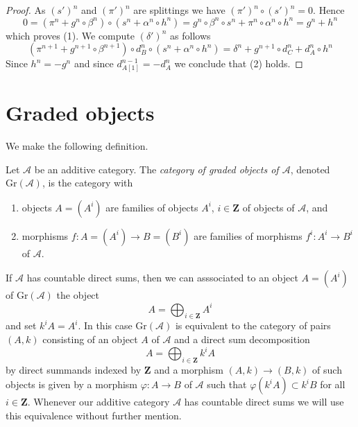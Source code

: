 \begin{proof}
As $(s')^n$ and $(\pi')^n$ are splittings we have $(\pi')^n \circ (s')^n = 0$.
Hence
$$
0 = ( \pi^n + g^n \circ \beta^n ) \circ ( s^n + \alpha^n \circ h^n ) =
g^n \circ \beta^n \circ s^n + \pi^n \circ \alpha^n \circ h^n =
g^n + h^n
$$
which proves (1). We compute $(\delta')^n$ as follows
$$
( \pi^{n + 1} + g^{n + 1} \circ \beta^{n + 1} )
\circ d_B^n \circ
( s^n + \alpha^n \circ h^n )
= \delta^n + g^{n + 1} \circ d_C^n + d_A^n \circ h^n
$$
Since $h^n = -g^n$ and since $d_{A[1]}^{n - 1} = -d_A^n$ we conclude that (2)
holds.
\end{proof}




\section{Graded objects}
\label{section-graded}

\noindent
We make the following definition.

\begin{definition}
\label{definition-graded}
Let $\mathcal{A}$ be an additive category. The {\it category of graded
objects of $\mathcal{A}$}, denoted $\text{Gr}(\mathcal{A})$, is
the category with
\begin{enumerate}
\item objects $A = (A^i)$ are families of objects $A^i$, $i \in \mathbf{Z}$
of objects of $\mathcal{A}$, and
\item morphisms $f : A = (A^i) \to B = (B^i)$ are families of
morphisms $f^i : A^i \to B^i$ of $\mathcal{A}$.
\end{enumerate}
\end{definition}

\noindent
If $\mathcal{A}$ has countable direct sums, then we can asssociated to
an object $A = (A^i)$ of $\text{Gr}(\mathcal{A})$ the object
$$
A = \bigoplus\nolimits_{i \in \mathbf{Z}} A^i
$$
and set $k^iA = A^i$. In this case $\text{Gr}(\mathcal{A})$ is equivalent
to the category of pairs $(A, k)$ consisting of an object $A$ of
$\mathcal{A}$ and a direct sum decomposition
$$
A = \bigoplus\nolimits_{i \in \mathbf{Z}} k^iA
$$
by direct summands indexed by $\mathbf{Z}$ and a morphism $(A, k) \to (B, k)$
of such objects is given by a morphism $\varphi : A \to B$ of $\mathcal{A}$
such that $\varphi(k^iA) \subset k^iB$ for all $i \in \mathbf{Z}$. Whenever
our additive category $\mathcal{A}$ has countable direct sums we will
use this equivalence without further mention.

